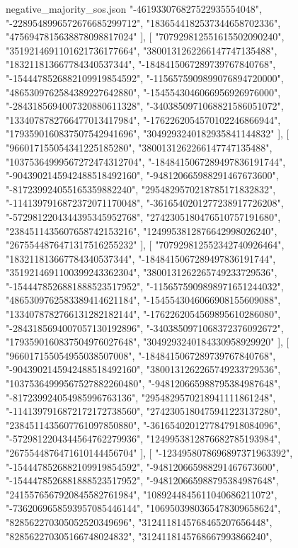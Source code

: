 \begin{filecontents*}[overwrite]{negative_majority_sos.json}
    "-461933076827522935554048",
    "-2289548996572676685299712",
    "1836544182537344658702336",
    "4756947815638878098817024"
   ],
   [
    "707929812551615502090240",
    "3519214691101621736177664",
    "3800131262266147747135488",
    "183211813667784340537344",
    "-1848415067289739767840768",
    "-1544478526882109919854592",
    "-1156575909899076894720000",
    "4865309762584389227642880",
    "-1545543046066956926976000",
    "-2843185694007320880611328",
    "-3403850971068821586051072",
    "1334078782766477013417984",
    "-1762262054570102246866944",
    "1793590160837507542941696",
    "3049293240182935841144832"
   ],
   [
    "966017155054341225185280",
    "3800131262266147747135488",
    "10375364999567272474312704",
    "-1848415067289497836191744",
    "-9043902145942488518492160",
    "-948120665988291467673600",
    "-817239924055165359882240",
    "2954829570218785171832832",
    "-1141397916872372071170048",
    "-3616540201277238917726208",
    "-5729812204344395345952768",
    "2742305180476510757191680",
    "2384511435607658742153216",
    "1249953812876642998026240",
    "2675544876471317516255232"
   ],
   [
    "707929812552342740926464",
    "183211813667784340537344",
    "-1848415067289497836191744",
    "3519214691100399243362304",
    "3800131262265749233729536",
    "-1544478526881888523517952",
    "-1156575909898971651244032",
    "4865309762583389414621184",
    "-1545543046066908155609088",
    "1334078782766131282182144",
    "-1762262054569895610286080",
    "-2843185694007057130192896",
    "-3403850971068372376092672",
    "1793590160837504976027648",
    "3049293240184330958929920"
   ],
   [
    "966017155054955038507008",
    "-1848415067289739767840768",
    "-9043902145942488518492160",
    "3800131262265749233729536",
    "10375364999567527882260480",
    "-948120665988795384987648",
    "-817239924054985996763136",
    "2954829570218941111861248",
    "-1141397916872172172738560",
    "2742305180475941223137280",
    "2384511435607761097850880",
    "-3616540201277847918084096",
    "-5729812204344564762279936",
    "1249953812876682785193984",
    "2675544876471610144456704"
   ],
   [
    "-1234958078696897371963392",
    "-1544478526882109919854592",
    "-948120665988291467673600",
    "-1544478526881888523517952",
    "-948120665988795384987648",
    "2415576567920845582761984",
    "1089244845611040686211072",
    "-7362069658593957085446144",
    "1069503980365478309658624",
    "828562270305052520349696",
    "3124118145768465207656448",
    "828562270305166748024832",
    "3124118145768667993866240",

\end{filecontents*}
